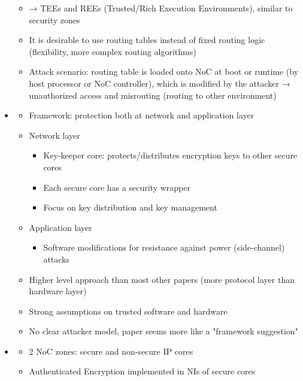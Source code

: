 \begin{itemize}
\begin{itemize}
            \item → TEEs and REEs (Trusted/Rich Execution Environments), similar to security zones
            \item It is desirable to use routing tables instead of fixed routing logic (flexibility, more complex routing algorithms)
            \item Attack scenario: routing table is loaded onto NoC at boot or runtime (by host processor or NoC controller), which is modified by
                the attacker → unauthorized access and misrouting (routing to other environment)
        \end{itemize}
    \item \textbf{}
        \begin{itemize}
            \item Framework: protection both at network and application layer
            \item Network layer
                \begin{itemize}
                    \item Key-keeper core: protects/distributes encryption keys to other secure cores
                    \item Each secure core has a security wrapper
                    \item Focus on key distribution and key management
                \end{itemize}
            \item Application layer
                \begin{itemize}
                    \item Software modifications for resistance against power (side-channel) attacks
                \end{itemize}
            \item Higher level approach than most other papers (more protocol layer than hardware layer)
            \item Strong assumptions on trusted software and hardware
            \item No clear attacker model, paper seems more like a "framework suggestion"
        \end{itemize}
    \item \textbf{}
        \begin{itemize}
            \item 2 NoC zones: secure and non-secure IP cores
            \item Authenticated Encryption implemented in NIs of secure cores

\end{itemize}
\end{itemize}

